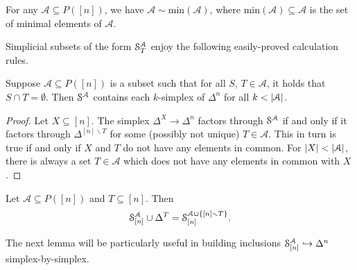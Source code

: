 \documentclass[main.tex]{subfiles}
\begin{document}
\begin{lemma}
  \label{lemma:replace_poset_by_minimal_elements}
  For any $\mathcal{A} \subseteq P([n])$, we have $\mathcal{A} \sim \mathrm{min}(\mathcal{A})$, where $\mathrm{min}(\mathcal{A}) \subseteq \mathcal{A}$ is the set of minimal elements of $\mathcal{A}$.
\end{lemma}

Simplicial subsets of the form $\S^{\mathcal{A}}_{T}$ enjoy the following easily-proved calculation rules.

\begin{lemma}
  \label{lemma:subset_of_simplex_contains_k_simplices}
  Suppose $\mathcal{A} \subseteq P([n])$ is a subset such that for all $S$, $T \in \mathcal{A}$, it holds that $S \cap T = \emptyset$. Then $\S^{\mathcal{A}}$ contains each $k$-simplex of $\Delta^{n}$ for all $k < \abs{\mathcal{A}}$.
\end{lemma}
\begin{proof}
  Let $X \subseteq [n]$. The simplex $\Delta^{X} \to \Delta^{n}$ factors through $\S^{\mathcal{A}}$ if and only if it factors through $\Delta^{[n] \smallsetminus T}$ for some (possibly not unique) $T \in \mathcal{A}$. This in turn is true if and only if $X$ and $T$ do not have any elements in common. For $\abs{X} < \abs{\mathcal{A}}$, there is always a set $T \in \mathcal{A}$ which does not have any elements in common with $X$.
\end{proof}

\begin{lemma}
  \label{lemma:add_a_simplex}
  Let $\mathcal{A} \subseteq P([n])$ and $T \subseteq [n]$. Then
  \begin{equation*}
    \S^{\mathcal{A}}_{[n]} \cup \Delta^{T} = \S^{\mathcal{A} \cup \{[n] \smallsetminus T\}}_{[n]}.
  \end{equation*}
\end{lemma}

The next lemma will be particularly useful in building inclusions $\S^{\mathcal{A}}_{[n]} \hookrightarrow \Delta^{n}$ simplex-by-simplex.
\end{document}
